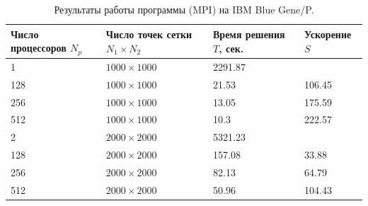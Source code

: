 \documentclass[11pt]{article}
\numberwithin{equation}{section}
\theoremstyle{plain}
\theoremstyle{definition}
\begin{document}
\begin{table}[h]
\centering
\begin{tabular}{|l|l|l|l|}\hline
Число процессоров $N_p$ & Число точек сетки $N_1 \times N_2$ & Время решения $T$, сек. & Ускорение $S$ \\ \hline
1                       & $1000 \times 1000$                 & 2291.87                 &               \\
128                     & $1000 \times 1000$                 & 21.53                   & 106.45        \\
256                     & $1000 \times 1000$                 & 13.05                   & 175.59        \\
512                     & $1000 \times 1000$                 & 10.3                    & 222.57        \\ \hline
2                       & $2000 \times 2000$                 & 5321.23                 &               \\
128                     & $2000 \times 2000$                 & 157.08                  & 33.88         \\
256                     & $2000 \times 2000$                 & 82.13                   & 64.79         \\
512                     & $2000 \times 2000$                 & 50.96                   & 104.43        \\ \hline
\end{tabular}
    \caption{Результаты работы программы (MPI) на IBM Blue Gene/P.}
\label{tab_mpi}
\end{table}
\end{document}

